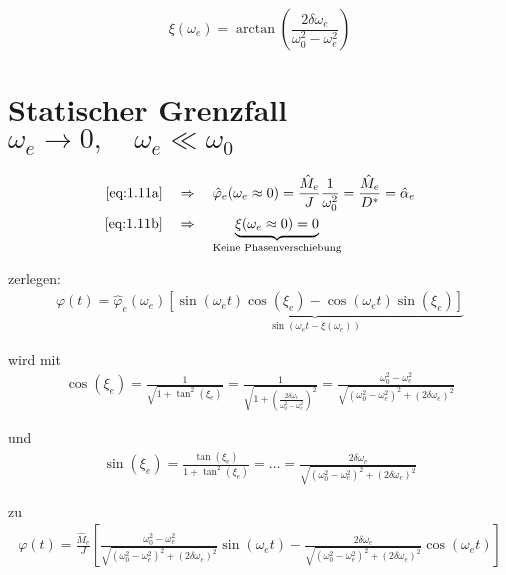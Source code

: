         \begin{equation}
            \xi(\omega_e) = \arctan\left(\frac{2\delta\omega_e}{\omega_0^2 - \omega_e^2}\right)\label{eq:1.11b}
        \end{equation}

    \section{Statischer Grenzfall \(\omega_e \rightarrow 0, \quad \omega_e \ll \omega_0\)}
    
        \begin{align}
            \cref{eq:1.11a} \quad &\Rightarrow \quad \hat{\varphi}_e(\omega_e \approx 0) = \frac{\hat{M}_e}{J} \frac{1}{\omega_0^2} = \frac{\hat{M}_e}{D^\ast} = \hat{\alpha}_e\label{eq:1.12}\\
            \cref{eq:1.11b} \quad &\Rightarrow \quad \underbrace{\xi(\omega_e \approx 0) = 0}_{\text{Keine Phasenverschiebung}}
        \end{align}

         zerlegen:
        \begin{align}
            \varphi(t) = \hat{\varphi}_e(\omega_e) \underbrace{\left[ \sin(\omega_e t)\cos(\xi_e) - \cos(\omega_e t)\sin(\xi_e) \right]}_{\sin(\omega_e t - \xi(\omega_e))}\nonumber
        \end{align}

        wird mit
        \begin{align}
            \cos(\xi_e) = \frac{1}{\sqrt{1+\tan^2(\xi_e)}} = \frac{1}{\sqrt{1 + \left(\frac{2\delta \omega_e}{\omega_0^2-\omega_e^2}\right)^2}} = \frac{\omega_0^2-\omega_e^2}{\sqrt{(\omega_0^2-\omega_e^2)^2+(2\delta\omega_e)^2}}\nonumber
        \end{align}

        und
        \begin{align}
            \sin(\xi_e) = \frac{\tan(\xi_e)}{1+\tan^2(\xi_e)} = \dots = \frac{2\delta\omega_e}{\sqrt{(\omega_0^2-\omega_e^2)^2+(2\delta\omega_e)^2}}\nonumber
        \end{align}

        zu
        \begin{align}
            \varphi(t) = \frac{\hat{M}_e}{J} \left[ \frac{\omega_0^2-\omega_e^2}{\sqrt{(\omega_0^2-\omega_e^2)^2+(2\delta\omega_e)^2}} \sin(\omega_e t) - \frac{2\delta\omega_e}{\sqrt{(\omega_0^2-\omega_e^2)^2+(2\delta\omega_e)^2}} \cos(\omega_e t) \right]\nonumber
        \end{align}


